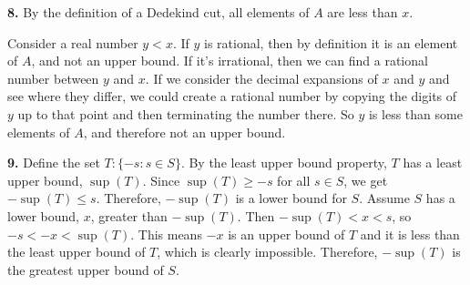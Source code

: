\documentclass{article}
\begin{document}
\textbf{8.} By the definition of a Dedekind cut, all elements of $A$ are less than $x$.
\newline

Consider a real number $y < x$. If $y$ is rational, then by definition it is an element of $A$, and not an upper bound. If it's irrational, then we can find a rational number between $y$ and $x$. If we consider the decimal expansions of $x$ and $y$ and see where they differ, we could create a rational number by copying the digits of $y$ up to that point and then terminating the number there. So $y$ is less than some elements of $A$, and therefore not an upper bound.
\newline

\textbf{9.} Define the set $T: \{-s: s \in S\}$. By the least upper bound property, $T$ has a least upper bound, $\sup(T)$. Since $\sup(T) \ge -s$ for all $s \in S$, we get $-\sup(T) \le s$. Therefore, $-\sup(T)$ is a lower bound for $S$. Assume $S$ has a lower bound, $x$, greater than $-\sup(T)$. Then $-\sup(T) < x < s$, so $-s < -x < \sup(T)$. This means $-x$ is an upper bound of $T$ and it is less than the least upper bound of $T$, which is clearly impossible. Therefore, $-\sup(T)$ is the greatest upper bound of $S$.
\end{document}
